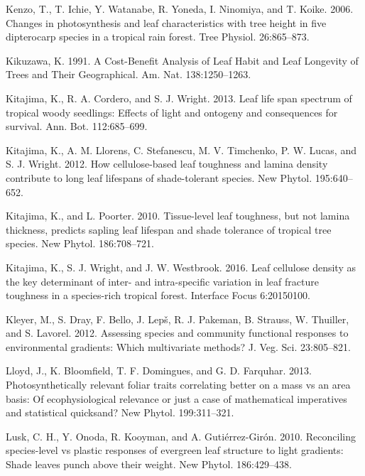 \documentclass[
  12pt,
]{article}
\newlength{\cslhangindent}
\newenvironment{cslreferences}%
  {\setlength{\parindent}{0pt}%
  \everypar{\setlength{\hangindent}{\cslhangindent}}\ignorespaces}%
  {\par}
\begin{document}
\begin{cslreferences}
\leavevmode\hypertarget{ref-Kenzo2006}{}%
Kenzo, T., T. Ichie, Y. Watanabe, R. Yoneda, I. Ninomiya, and T. Koike. 2006. Changes in photosynthesis and leaf characteristics with tree height in five dipterocarp species in a tropical rain forest. Tree Physiol. 26:865--873.

\leavevmode\hypertarget{ref-Kikuzawa1991}{}%
Kikuzawa, K. 1991. A Cost-Benefit Analysis of Leaf Habit and Leaf Longevity of Trees and Their Geographical. Am. Nat. 138:1250--1263.

\leavevmode\hypertarget{ref-Kitajima2013}{}%
Kitajima, K., R. A. Cordero, and S. J. Wright. 2013. Leaf life span spectrum of tropical woody seedlings: Effects of light and ontogeny and consequences for survival. Ann. Bot. 112:685--699.

\leavevmode\hypertarget{ref-Kitajima2012}{}%
Kitajima, K., A. M. Llorens, C. Stefanescu, M. V. Timchenko, P. W. Lucas, and S. J. Wright. 2012. How cellulose-based leaf toughness and lamina density contribute to long leaf lifespans of shade-tolerant species. New Phytol. 195:640--652.

\leavevmode\hypertarget{ref-Kitajima2010}{}%
Kitajima, K., and L. Poorter. 2010. Tissue-level leaf toughness, but not lamina thickness, predicts sapling leaf lifespan and shade tolerance of tropical tree species. New Phytol. 186:708--721.

\leavevmode\hypertarget{ref-Kitajima2016}{}%
Kitajima, K., S. J. Wright, and J. W. Westbrook. 2016. Leaf cellulose density as the key determinant of inter- and intra-specific variation in leaf fracture toughness in a species-rich tropical forest. Interface Focus 6:20150100.

\leavevmode\hypertarget{ref-Kleyer2012}{}%
Kleyer, M., S. Dray, F. Bello, J. Lepš, R. J. Pakeman, B. Strauss, W. Thuiller, and S. Lavorel. 2012. Assessing species and community functional responses to environmental gradients: Which multivariate methods? J. Veg. Sci. 23:805--821.

\leavevmode\hypertarget{ref-Lloyd2013}{}%
Lloyd, J., K. Bloomfield, T. F. Domingues, and G. D. Farquhar. 2013. Photosynthetically relevant foliar traits correlating better on a mass vs an area basis: Of ecophysiological relevance or just a case of mathematical imperatives and statistical quicksand? New Phytol. 199:311--321.

\leavevmode\hypertarget{ref-Lusk2010}{}%
Lusk, C. H., Y. Onoda, R. Kooyman, and A. Gutiérrez-Girón. 2010. Reconciling species-level vs plastic responses of evergreen leaf structure to light gradients: Shade leaves punch above their weight. New Phytol. 186:429--438.


\end{cslreferences}
\end{document}
